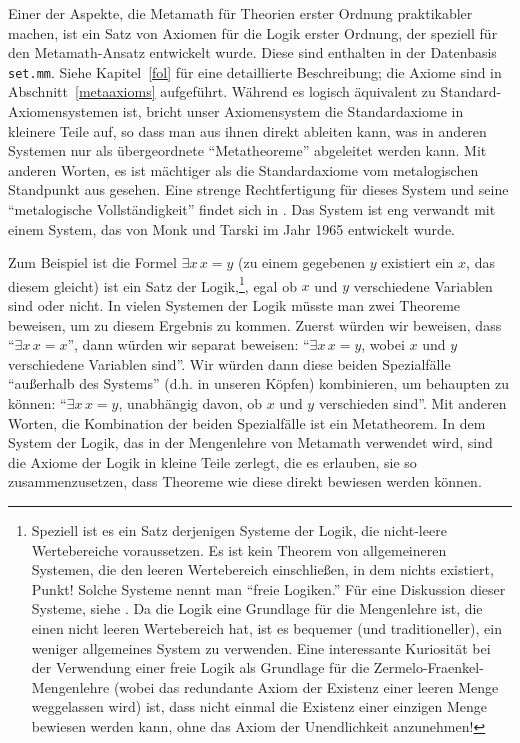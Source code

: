 Einer der Aspekte, die Metamath für Theorien erster Ordnung praktikabler machen, ist ein Satz von Axiomen für die Logik erster Ordnung, der speziell für den Metamath-Ansatz entwickelt wurde.  Diese sind enthalten in der Datenbasis \texttt{set.mm}.
Siehe Kapitel~\ref{fol} für eine detaillierte Beschreibung; die Axiome sind in Abschnitt~\ref{metaaxioms} aufgeführt.  Während es logisch äquivalent zu Standard-Axiomensystemen ist, bricht unser Axiomensystem die Standardaxiome in kleinere Teile auf, so dass man aus ihnen direkt ableiten kann, was in anderen Systemen nur als übergeordnete "`Metatheoreme"' abgeleitet werden kann.
Mit anderen Worten, es ist mächtiger als die Standardaxiome vom metalogischen Standpunkt aus gesehen.  Eine strenge Rechtfertigung für dieses System und seine "`metalogische Vollständigkeit"' findet sich in
\cite{Megill}.  Das System ist eng verwandt mit einem System, das von Monk und Tarski im Jahr 1965 \cite{Monks} entwickelt wurde.

Zum Beispiel ist die Formel $\exists x \, x = y $ (zu einem gegebenen $y$ existiert ein
$x$, das diesem gleicht) ist ein Satz der Logik,\footnote{Speziell ist es ein Satz
derjenigen Systeme der Logik, die nicht-leere Wertebereiche voraussetzen.  Es ist kein Theorem von allgemeineren Systemen, die den leeren Wertebereich einschließen, in dem nichts existiert, Punkt!  Solche Systeme nennt man "`freie Logiken."' Für eine Diskussion dieser Systeme, siehe \cite{Leblanc}.  Da die Logik eine Grundlage für die Mengenlehre ist, die einen nicht leeren Wertebereich hat, ist es bequemer (und traditioneller), ein weniger allgemeines System zu verwenden.  Eine interessante Kuriosität bei der Verwendung einer freie Logik als Grundlage für die Zermelo-Fraenkel-Mengenlehre (wobei das redundante Axiom der Existenz einer leeren Menge weggelassen wird) ist, dass nicht einmal die Existenz einer einzigen Menge bewiesen werden kann, ohne das Axiom der Unendlichkeit anzunehmen!}, egal ob $x$ und $y$ verschiedene Variablen sind oder nicht.
In vielen Systemen der Logik müsste man zwei Theoreme beweisen, um zu diesem Ergebnis zu kommen.  Zuerst würden wir beweisen, dass "`$\exists x \, x = x $"', dann würden wir separat beweisen: "`$\exists x \, x = y $, wobei $x$ und $y$ verschiedene Variablen sind"'.  Wir würden dann diese beiden Spezialfälle "`außerhalb des Systems"' (d.h. in unseren Köpfen) kombinieren, um behaupten zu können: "`$\exists x \, x = y $, unabhängig davon, ob $x$ und $y$ verschieden sind"'.  Mit anderen Worten, die Kombination der beiden Spezialfälle ist ein Metatheorem.  In dem System der Logik, das in der Mengenlehre von Metamath verwendet wird, sind die Axiome der Logik in kleine Teile zerlegt, die es erlauben, sie so zusammenzusetzen, dass Theoreme wie diese direkt bewiesen werden können.

